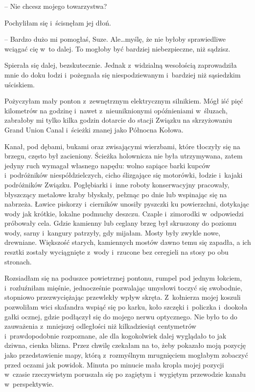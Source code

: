 \documentclass[oneside,polish,11pt,sfheadings]{mwbk}
\begin{document}
-- Nie chcesz mojego towarzystwa?

Pochyliłam się i~ścisnęłam jej dłoń. 

-- Bardzo dużo mi pomogłaś, Suze.
Ale\ldots  myślę, że nie byłoby sprawiedliwe wciągać cię w~to dalej. To
mogłoby być bardziej niebezpieczne, niż sądzisz.

Spierała się dalej, bezskutecznie. Jednak z~widzialną wesołością
zaprowadziła mnie do doku łodzi i~pożegnała się niespodziewanym i~bardziej niż sąsiedzkim uściskiem.

Pożyczyłam mały ponton z~zewnętrznym elektrycznym silnikiem. Mógł iść
pięć kilometrów na godzinę i~nawet z~nieuniknionymi opóźnieniami w~śluzach, zabrałoby mi tylko kilka godzin dotarcie do stacji Związku na
skrzyżowaniu Grand Union Canal i~ścieżki znanej jako Północna Kołowa.

Kanał, pod dębami, bukami oraz zwisającymi wierzbami, które tłoczyły się
na brzegu, często był zacieniony. Ścieżka holownicza nie była
utrzymywana, zatem jedyny ruch wymagał własnego napędu: wolno sapiące
barki kupców i~podróżników niespółdzielczych, cicho ślizgające się
motorówki, łodzie i~kajaki podróżników Związku. Pogłębiarki i~inne
roboty konserwacyjny pracowały, błyszczący metalowe kraby błyskały,
pełznąc po dnie lub wspinając się na nabrzeża. Ławice piskorzy i~cierników unosiły pyszczki ku powierzchni, dotykając wody jak krótkie,
lokalne podmuchy deszczu. Czaple i~zimorodki w~odpowiedzi próbowały
cela. Gdzie kamienny lub ceglany brzeg był skruszony do poziomu wody,
sarny i~kangury patrzyły, gdy mijałam. Mosty były zwykle nowe,
drewniane. Większość starych, kamiennych mostów dawno temu się zapadła,
a ich resztki zostały wyciągnięte z~wody i~rzucone bez ceregieli na
stosy po obu stronach.

Rozsiadłam się na poduszce powietrznej pontonu, rumpel pod jednym
łokciem, i~rozluźniłam mięśnie, jednocześnie pozwalając umysłowi toczyć
się swobodnie, stopniowo przezwyciężając przewlekły wpływ skręta. Z~kołnierza mojej koszuli pozwoliłam wici skafandra wspiąć się po karku,
koło szczęki i~policzka i~dookoła gałki ocznej, gdzie podłączył się do
mojego nerwu optycznego. Nie było to do zauważenia z~mniejszej
odległości niż kilkadziesiąt centymetrów i~prawdopodobnie rozpoznane,
ale dla kogokolwiek dalej wyglądało to jak dziwna, cienka blizna. Przez
chwilę czekałam na to, żeby pokazało moją pozycję jako przedstawienie
mapy, którą z~rozmyślnym mrugnięciem mogłabym zobaczyć przed oczami jak
powidok. Minuta po minucie mała kropla mojej pozycji w~czasie
rzeczywistym poruszała się po zagiętym i~wygiętym przewodzie kanału w~perspektywie.
\end{document}
